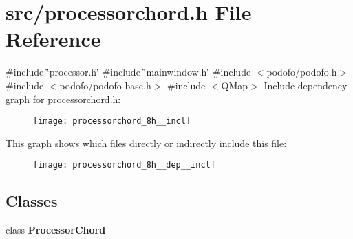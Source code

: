 \section{src/processorchord.h File Reference}
\label{processorchord_8h}
{\ttfamily \#include \char`\"{}processor.\+h\char`\"{}}\newline
{\ttfamily \#include \char`\"{}mainwindow.\+h\char`\"{}}\newline
{\ttfamily \#include $<$podofo/podofo.\+h$>$}\newline
{\ttfamily \#include $<$podofo/podofo-\/base.\+h$>$}\newline
{\ttfamily \#include $<$Q\+Map$>$}\newline
Include dependency graph for processorchord.\+h\+:\nopagebreak
\begin{figure}[H]
\begin{center}
\leavevmode
\texttt{[image: processorchord\_8h\_\_incl]}
\end{center}
\end{figure}
This graph shows which files directly or indirectly include this file\+:\nopagebreak
\begin{figure}[H]
\begin{center}
\leavevmode
\texttt{[image: processorchord\_8h\_\_dep\_\_incl]}
\end{center}
\end{figure}
\subsection*{Classes}
\begin{DoxyCompactItemize}
\item 
class \textbf{ Processor\+Chord}
\end{DoxyCompactItemize}
